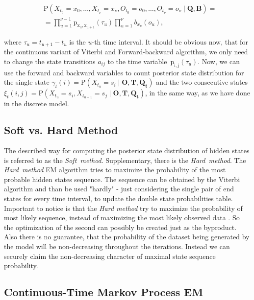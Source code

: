 \documentclass[thesis=M,english]{FITthesis}[2012/10/20]
\newcommand{\matr}[1]{\mathbf{#1}}
\begin{document}
\begin{equation}
\begin{aligned}
&\mathrm{P}(X_{t_0} = x_0, \dots ,X_{t_\nu} = x_\nu, O_{t_0} = o_0, \dots ,O_{t_\nu} = o_\nu \mid \matr{Q}, \matr{B} ) = \\
& = \prod_{u=1}^{\nu-1} \mathrm{p_{x_u, x_{u+1}}} (\tau_u) \prod_{u=1}^{\nu} b_{ x_u }(o_u),
\end{aligned}
\end{equation}

where $\tau_u = t_{u+1} - t_{u}$ is the $u$-th time interval. It should be obvious now, that for the continuous variant of Viterbi and Forward-backward algorithm, we only need to change the state transitions $a_{ij}$ to the time variable~$\mathrm{p_{i,j}}( \tau_u )$.   
Now, we can use the forward and backward variables to count posterior state distribution for the single state  $\gamma_t(i) = \mathrm{P}( X_{t_u} = s_i \mid \matr{O},\matr{T}, \matr{ Q_t } )$ and the two consecutive states $\xi_t(i,j) = \mathrm{P}( X_{t_u} = s_i, X_{t_{u+1}} = s_j \mid \matr{O},\matr{T}, \matr{ Q_t } )$, in the same way,  as we have done in the discrete model.

\subsection{Soft vs. Hard Method}\label{sec:shm}

The described way for computing the posterior state distribution of hidden states is referred to as the \textit{Soft~method}. Supplementary, there is the \textit{Hard~method}. The \textit{Hard~method} EM algorithm tries to maximize the probability of the most probable hidden states sequence. The sequence can be obtained by the Viterbi algorithm and than be used "hardly" - just considering the single pair of end states for every time interval, to update the double state probabilities table. Important to notice is that the \textit{Hard method} try to maximize the probability of most likely sequence, instead of maximizing the most likely observed data \cite{Al11}. So the optimization of the second can possibly be created just as the byproduct. Also there is no guarantee, that the probability of the dataset being generated by the model will be non-decreasing throughout the iterations. Instead we can securely claim the non-decreasing character of maximal state sequence probability. 


\subsection{Continuous-Time Markov Process EM} 
\end{document}
